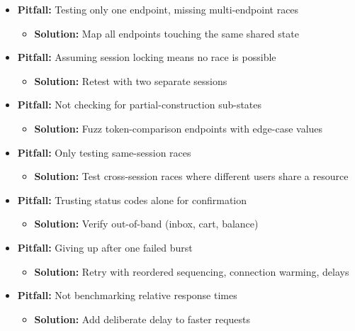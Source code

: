 \documentclass[11pt]{article}
\begin{document}
\begin{itemize}
    \item \textbf{Pitfall:} Testing only one endpoint, missing multi-endpoint races
    \begin{itemize}
        \item \textbf{Solution:} Map all endpoints touching the same shared state
    \end{itemize}
    
    \item \textbf{Pitfall:} Assuming session locking means no race is possible
    \begin{itemize}
        \item \textbf{Solution:} Retest with two separate sessions
    \end{itemize}
    
    \item \textbf{Pitfall:} Not checking for partial-construction sub-states
    \begin{itemize}
        \item \textbf{Solution:} Fuzz token-comparison endpoints with edge-case values
    \end{itemize}
    
    \item \textbf{Pitfall:} Only testing same-session races
    \begin{itemize}
        \item \textbf{Solution:} Test cross-session races where different users share a resource
    \end{itemize}
    
    \item \textbf{Pitfall:} Trusting status codes alone for confirmation
    \begin{itemize}
        \item \textbf{Solution:} Verify out-of-band (inbox, cart, balance)
    \end{itemize}
    
    \item \textbf{Pitfall:} Giving up after one failed burst
    \begin{itemize}
        \item \textbf{Solution:} Retry with reordered sequencing, connection warming, delays
    \end{itemize}
    
    \item \textbf{Pitfall:} Not benchmarking relative response times
    \begin{itemize}
        \item \textbf{Solution:} Add deliberate delay to faster requests
    \end{itemize}
\end{itemize}
\end{document}
